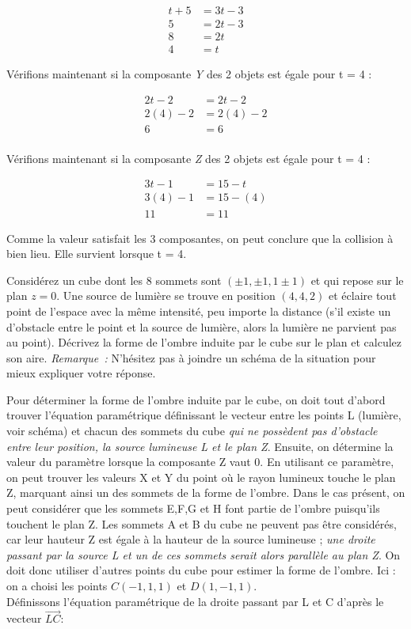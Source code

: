 \documentclass[12pt,addpoints]{exam}
\begin{document}
\begin{questions}
\begin{solution}
\begin{align*} 
t + 5 & = 3t - 3 \\
5 & = 2t - 3 \\ 
8 & = 2t \\ 
4 & = t
\end{align*}

Vérifions maintenant si la composante \emph{Y} des 2 objets est égale pour t = 4 : 

\begin{align*} 
2t - 2 & = 2t - 2 \\
2(4) - 2 & = 2(4) - 2 \\
6 & = 6 \\
\end{align*}

Vérifions maintenant si la composante \emph{Z} des 2 objets est égale pour t = 4 : 

\begin{align*} 
3t - 1 & = 15 - t \\
3(4) - 1 & = 15 - (4) \\
11 & = 11
\end{align*}

Comme la valeur satisfait les 3 composantes, on peut conclure que la collision à bien lieu. Elle survient lorsque t = 4.

\end{solution}

\question[20]
Considérez un cube dont les 8 sommets sont $(\pm 1, \pm 1, 1 \pm 1)$ et qui repose sur le plan $z = 0$. Une source de lumière se trouve en position $(4,4,2)$ et éclaire tout point de l'espace avec la même intensité, peu importe la distance (s'il existe un d'obstacle entre le point et la source de lumière, alors la lumière ne parvient pas au point). Décrivez la forme de l'ombre induite par le cube sur le plan et calculez son aire. \emph{Remarque~:} N'hésitez pas à joindre un schéma de la situation pour mieux expliquer votre réponse.

\begin{solution}
Pour déterminer la forme de l'ombre induite par le cube, on doit tout d'abord trouver l'équation paramétrique définissant le vecteur entre les points L (lumière, voir schéma) et chacun des sommets du cube \emph{qui ne possèdent pas d'obstacle entre leur position, la source lumineuse L et le plan Z}. Ensuite, on détermine la valeur du paramètre lorsque la composante Z vaut 0. En utilisant ce paramètre, on peut trouver les valeurs X et Y du point où le rayon lumineux touche le plan Z, marquant ainsi un des sommets de la forme de l'ombre. Dans le cas présent, on peut considérer que les sommets E,F,G et H font partie de l'ombre puisqu'ils touchent le plan Z. Les sommets A et B du cube ne peuvent pas être considérés, car leur hauteur Z est égale à la hauteur de la source lumineuse ; \emph{une droite passant par la source L et un de ces sommets serait alors parallèle au plan Z}. On doit donc utiliser d'autres points du cube pour estimer la forme de l'ombre. Ici : on a choisi les points $C(-1,1,1)$ et $D(1,-1,1)$. \\ Définissons l'équation paramétrique de la droite passant par L et C d'après le vecteur $\vec{LC}$: 


\end{solution}
\end{questions}
\end{document}
